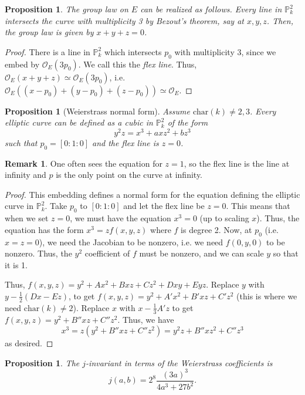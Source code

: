 \documentclass[10pt]{article}
\newtheorem{prop}[thm]{Proposition}
\theoremstyle{definition}
\newtheorem{rmk}[thm]{Remark}
\newcommand{\PP}{\mathbb{P}}
\newcommand{\OO}{\mathcal{O}}
\newcommand{\todo}[1]{\textbf{\textcolor{red}{TODO #1}}}
\begin{document}
\begin{prop}
The group law on $E$ can be realized as follows.  Every line in $\PP^2_k$ intersects the curve with multiplicity 3 by Bezout's theorem, say at $x, y, z$.  Then, the group law is given by $x+y+z=0$.
\end{prop}
\begin{proof}
There is a line in $\PP^2_k$ which intersects $p_0$ with multiplicity 3, since we embed by $\OO_E(3p_0)$.  We call this the \emph{flex line}.  Thus, $\OO_E(x+y+z) \simeq \OO_E(3p_0)$, i.e. $\OO_E((x-p_0)+(y-p_0)+(z-p_0)) \simeq \OO_E$.
\end{proof}

\begin{prop}[Weierstrass normal form]
Assume $\text{char}(k) \ne 2, 3$.  Every elliptic curve can be defined as a cubic in $\PP^2_k$ of the form
$$y^2z = x^3 + axz^2 + bz^3$$
such that $p_0 = [0:1:0]$ and the flex line is $z=0$.
\end{prop}
\begin{rmk}
One often sees the equation for $z=1$, so the flex line is the line at infinity and $p$ is the only point on the curve at infinity.
\end{rmk}
\begin{proof}
This embedding defines a normal form for the equation defining the elliptic curve in $\PP^2_k$.  Take $p_0$ to $[0:1:0]$ and let the flex line be $z=0$.  This means that when we set $z = 0$, we must have the equation $x^3 = 0$ (up to scaling $x$).  Thus, the equation has the form $x^3 = z f(x,y,z)$  where $f$ is degree 2.  Now, at $p_0$ (i.e. $x=z=0$), we need the Jacobian to be nonzero, i.e. we need $f(0,y,0)$ to be nonzero.  Thus, the $y^2$ coefficient of $f$ must be nonzero, and we can scale $y$ so that it is 1.  

Thus, $f(x,y,z) = y^2 + Ax^2 + Bxz + Cz^2 + Dxy + E yz$.  Replace $y$ with $y - \frac 1 2 ( Dx - Ez)$, to get $f(x,y,z) = y^2 + A'x^2 + B'xz + C'z^2$ (this is where we need $\text{char}(k) \neq 2$).  Replace $x$ with $x - \frac 1 3 A' z$ to get $f(x,y,z) = y^2 + B''xz + C''z^2$.  Thus, we have
$$x^3 = z(y^2 + B''xz + C''z^2) = y^2z + B''xz^2 + C''z^3$$
as desired.
\end{proof}

\begin{prop}
The $j$-invariant in terms of the Weierstrass coefficients is
$$j(a,b) = 2^8 \frac{(3a)^3}{4a^3 + 27b^2}.$$
\end{prop}
%
\end{document}
